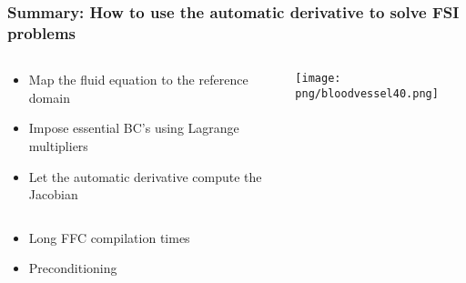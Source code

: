 \begin{frame}
  \frametitle{Summary: How to use the automatic derivative to solve FSI problems}

 \begin{columns}
  \begin{column}{0.6\textwidth}
  \begin{itemize}
  \item
    Map the fluid equation to the reference domain
  \item<2->
    Impose essential BC's using Lagrange multipliers
  \item<3->
    Let the automatic derivative compute the Jacobian 
  \end{itemize}
\end{column}
    \begin{column}{0.4\textwidth}
     \texttt{[image: png/bloodvessel40.png]}
    \end{column}  
  \vspace{1cm}
\end{columns}

  \begin{itemize}
  \item<4->
    Long FFC compilation times
  \item<5->
    Preconditioning
  \end{itemize}

\end{frame}

